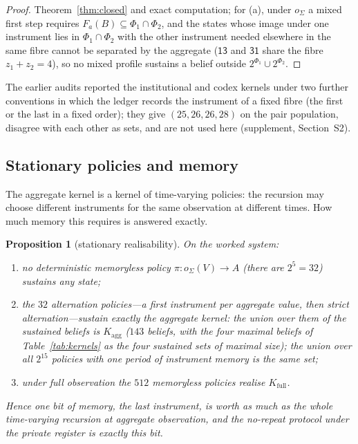 \documentclass[11pt,a4paper]{article}
\theoremstyle{plain}
\newtheorem{proposition}[theorem]{Proposition}
\theoremstyle{definition}
\theoremstyle{remark}
\newcommand{\st}[1]{\mathsf{#1}}
\newcommand{\oagg}{o_{\Sigma}}
\newcommand{\Kagg}{K_{\mathrm{agg}}}
\newcommand{\Kfull}{K_{\mathrm{full}}}
\begin{document}
\begin{proof}
Theorem~\ref{thm:closed} and exact computation; for (a), under $\oagg$ a mixed first step requires $F_a(B)\subseteq\Phi_1\cap\Phi_2$, and the states whose image under one instrument lies in $\Phi_1\cap\Phi_2$ with the other instrument needed elsewhere in the same fibre cannot be separated by the aggregate ($\st{13}$ and $\st{31}$ share the fibre $z_1+z_2=4$), so no mixed profile sustains a belief outside $2^{\Phi_1}\cup2^{\Phi_2}$.
\end{proof}

The earlier audits reported the institutional and codex kernels under two further conventions in which the ledger records the instrument of a fixed fibre (the first or the last in a fixed order); they give $(25,26,26,28)$ on the pair population, disagree with each other as sets, and are not used here (supplement, Section~S2).

\subsection{Stationary policies and memory}\label{sec:stationary}

The aggregate kernel is a kernel of time-varying policies: the recursion may choose different instruments for the same observation at different times. How much memory this requires is answered exactly.

\begin{proposition}[stationary realisability]\label{prop:stationary}
On the worked system:
\begin{enumerate}[label=(\alph*),leftmargin=2em,itemsep=1pt]
\item no deterministic memoryless policy $\pi:\oagg(V)\to A$ (there are $2^5=32$) sustains any state;
\item the $32$ \emph{alternation policies}---a first instrument per aggregate value, then strict alternation---sustain exactly the aggregate kernel: the union over them of the sustained beliefs is $\Kagg$ ($143$ beliefs, with the four maximal beliefs of Table~\ref{tab:kernels} as the four sustained sets of maximal size); the union over all $2^{15}$ policies with one period of instrument memory is the same set;
\item under full observation the $512$ memoryless policies realise $\Kfull$.
\end{enumerate}
Hence one bit of memory, the last instrument, is worth as much as the whole time-varying recursion at aggregate observation, and the no-repeat protocol under the private register is exactly this bit.
\end{proposition}
\end{document}
